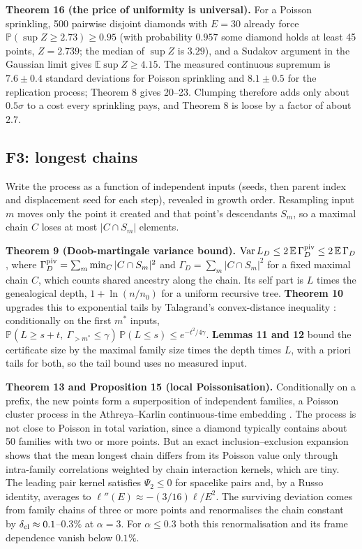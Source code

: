 \textbf{Theorem 16 (the price of uniformity is universal).}
For a Poisson sprinkling, 500 pairwise disjoint diamonds
with \(E=30\) already force
\(\mathbb{P}(\sup Z\ge2.73)\ge0.95\) (with probability
\(0.957\) some diamond holds at least 45 points,
\(Z=2.739\); the median of \(\sup Z\) is \(3.29\)), and a
Sudakov argument in the Gaussian limit gives
\(\mathbb{E}\sup Z\ge4.15\). The measured continuous
supremum is \(7.6\pm0.4\) standard deviations for Poisson
sprinkling and \(8.1\pm0.5\) for the replication process;
Theorem 8 gives 20--23. Clumping therefore adds only about
\(0.5\sigma\) to a cost every sprinkling pays, and Theorem 8
is loose by a factor of about \(2.7\).

\hypertarget{f3-longest-chains}{%
\subsection{F3: longest chains}\label{f3-longest-chains}}

Write the process as a function of independent inputs
(seeds, then parent index and displacement seed for each
step), revealed in growth order. Resampling input \(m\)
moves only the point it created and that point's descendants
\(S_m\), so a maximal chain \(C\) loses at most
\(|C\cap S_m|\) elements.

\textbf{Theorem 9 (Doob-martingale variance bound).}
\(\mathrm{Var}\,L_D\le2\,\mathbb{E}\,\Gamma_D^{\rm piv}\le2\,\mathbb{E}\,\Gamma_D\),
where \(\Gamma_D^{\rm piv}=\sum_m\min_C|C\cap S_m|^2\) and
\(\Gamma_D=\sum_m|C\cap S_m|^2\) for a fixed maximal chain
\(C\), which counts shared ancestry along the chain. Its
self part is \(L\) times the genealogical depth,
\(1+\ln(n/n_0)\) for a uniform recursive tree.
\textbf{Theorem 10} upgrades this to exponential tails by
Talagrand's convex-distance inequality \cite{Talagrand95}:
conditionally on the first \(m^*\) inputs,
\(\mathbb{P}(L\ge s+t,\ \Gamma_{>m^*}\le\gamma)\,\mathbb{P}(L\le s)\le e^{-t^2/4\gamma}\).
\textbf{Lemmas 11 and 12} bound the certificate size by the
maximal family size times the depth times \(L\), with a
priori tails for both, so the tail bound uses no measured
input.

\textbf{Theorem 13 and Proposition 15 (local
Poissonisation).} Conditionally on a prefix, the new points
form a superposition of independent families, a Poisson
cluster process in the Athreya--Karlin continuous-time
embedding \cite{AK68}. The process is not close to Poisson
in total variation, since a diamond typically contains about
50 families with two or more points. But an exact
inclusion--exclusion expansion shows that the mean longest
chain differs from its Poisson value only through
intra-family correlations weighted by chain interaction
kernels, which are tiny. The leading pair kernel satisfies
\(\Psi_2\le0\) for spacelike pairs and, by a Russo identity,
averages to \(\ell''(E)\approx-(3/16)\ell/E^2\). The
surviving deviation comes from family chains of three or
more points and renormalises the chain constant by
\(\delta_{\rm cl}\approx0.1\)--\(0.3\%\) at \(\alpha=3\).
For \(\alpha\le0.3\) both this renormalisation and its frame
dependence vanish below \(0.1\%\).

